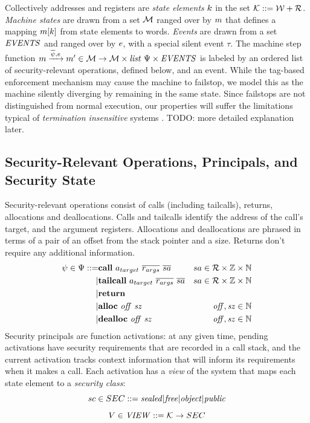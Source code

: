 \documentclass[10pt,conference]{ieeetran}%
\theoremstyle{definition}
\begin{document}
Collectively addresses and registers are {\em state elements} \(k\)
in the set \({\mathcal K} ::= {\mathcal W} + {\mathcal R}\).
%
{\em Machine states} are drawn from a set \({\mathcal M}\) ranged over by \(m\)
that defines a mapping \(m[k]\) from state elements to words.
{\em Events} are drawn from a set \(\mathit{EVENTS}\) and ranged over by \(e\), with a
special silent event \(\tau\).
The machine step function
\(m \xrightarrow{\overline{\psi},e} m' \in {\mathcal M} \rightarrow
{\mathcal M} \times \mathit{list} ~ \Psi \times \mathit{EVENTS}\)
is labeled by an ordered list of security-relevant operations, defined below,
and an event.
While the tag-based enforcement mechanism may cause the machine to
failstop, we model this as the machine silently diverging by remaining in the
same state. Since failstops are not distinguished from normal execution,
our properties will suffer the limitations typical of
{\it termination insensitive} systems \cite{}. TODO: more detailed explanation later.

\subsection{Security-Relevant Operations, Principals, and Security State}

Security-relevant operations consist of calls (including tailcalls), returns,
allocations and deallocations.  Calls and tailcalls identify the address of the call's target,
and the argument registers.  Allocations and deallocations are phrased in terms of a pair
of an offset from the stack pointer and a size. Returns don't require any additional information.
%
\begin{align*}
  \psi \in \Psi ::= & \mathbf{call} ~ a_{target} ~ \overline{r_{args}} ~ \overline{sa} &
  sa \in {\mathcal R} \times \mathbb{Z} \times \mathbb{N} \\
  | & \mathbf{tailcall} ~ a_{target}  ~ \overline{r_{args}} ~ \overline{sa} &
  sa \in {\mathcal R} \times \mathbb{Z} \times \mathbb{N} \\
  | & \mathbf{return} & \\
  | & \mathbf{alloc} ~ \mathit{off ~ sz} & \mathit{off, sz} \in \mathbb{N} \\
  | & \mathbf{dealloc} ~ \mathit{off ~ sz} & \mathit{off, sz} \in \mathbb{N} \\
\end{align*}
%
Security principals are function activations: at any given time, pending activations
have security requirements that are recorded in a call stack, and the current
activation tracks context information that will inform its requirements when
it makes a call. Each activation has a {\it view}
of the system that maps each state element to a {\it security class}:
\[sc \in SEC ::= \mathit{sealed} | \mathit{free} | \mathit{object} | \mathit{public}\]
\[V \in \mathit{VIEW} ::= {\mathcal K} \rightarrow SEC\]
\end{document}
